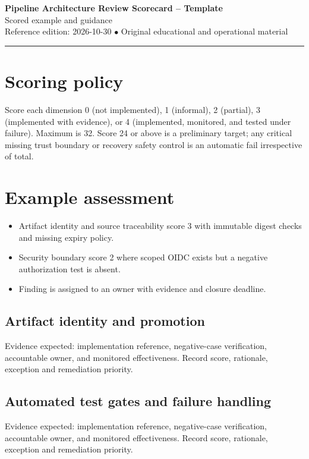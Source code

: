 \documentclass[10pt,letterpaper]{article}
\begin{document}
\begin{center}
{\LARGE\bfseries\color{cdblue}Pipeline Architecture Review Scorecard -- Template}\\[7pt]
{\large Scored example and guidance}\\[6pt]
{\small Reference edition: 2026-10-30 $\bullet$ Original educational and operational material}
\end{center}
\noindent\color{cdblue}\rule{\linewidth}{1.2pt}\color{black}
\vspace{0.4em}
\section{Scoring policy}
Score each dimension 0 (not implemented), 1 (informal), 2 (partial), 3 (implemented with evidence), or 4 (implemented, monitored, and tested under failure). Maximum is 32. Score 24 or above is a preliminary target; any critical missing trust boundary or recovery safety control is an automatic fail irrespective of total.


\section{Example assessment}
\begin{itemize}
\item Artifact identity and source traceability score 3 with immutable digest checks and missing expiry policy.
\item Security boundary score 2 where scoped OIDC exists but a negative authorization test is absent.
\item Finding is assigned to an owner with evidence and closure deadline.
\end{itemize}

\subsection{Artifact identity and promotion}
Evidence expected: implementation reference, negative-case verification, accountable owner, and monitored effectiveness. Record score, rationale, exception and remediation priority.


\subsection{Automated test gates and failure handling}
Evidence expected: implementation reference, negative-case verification, accountable owner, and monitored effectiveness. Record score, rationale, exception and remediation priority.
\end{document}
